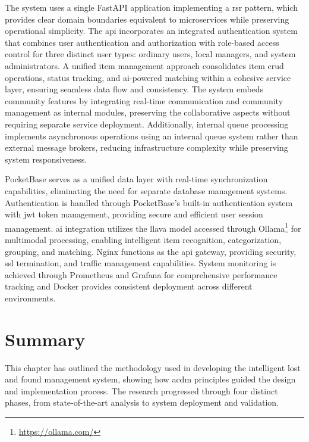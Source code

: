 The system uses a single FastAPI application implementing a \ac{rsr} pattern, which provides clear domain boundaries equivalent to microservices while preserving operational simplicity. The \ac{api} incorporates an integrated authentication system that combines user authentication and authorization with role-based access control for three distinct user types: ordinary users, local managers, and system administrators. A unified item management approach consolidates item \ac{crud} operations, status tracking, and \ac{ai}-powered matching within a cohesive service layer, ensuring seamless data flow and consistency. The system embeds community features by integrating real-time communication and community management as internal modules, preserving the collaborative aspects without requiring separate service deployment. Additionally, internal queue processing implements asynchronous operations using an internal queue system rather than external message brokers, reducing infrastructure complexity while preserving system responsiveness.

PocketBase serves as a unified data layer with real-time synchronization capabilities, eliminating the need for separate database management systems. Authentication is handled through PocketBase's built-in authentication system with \ac{jwt} token management, providing secure and efficient user session management. \ac{ai} integration utilizes the \ac{llava} model accessed through Ollama\footnote{\url{https://ollama.com/}} for multimodal processing, enabling intelligent item recognition, categorization, grouping, and matching. Nginx functions as the \ac{api} gateway, providing security, \ac{ssl} termination, and traffic management capabilities. System monitoring is achieved through Prometheus and Grafana for comprehensive performance tracking and Docker provides consistent deployment across different environments.



\section{Summary} \label{section:methodology_summary}

This chapter has outlined the methodology used in developing the intelligent lost and found management system, showing how \ac{acdm} principles guided the design and implementation process. The research progressed through four distinct phases, from state-of-the-art analysis to system deployment and validation.

